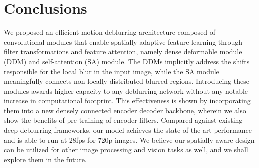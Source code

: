 \documentclass[letterpaper]{article} \usepackage{aaai20}  \usepackage{times}  \usepackage{helvet} \usepackage{courier}  \usepackage[hyphens]{url}  \usepackage{graphicx} \urlstyle{rm} \def\UrlFont{\rm}  \usepackage{graphicx}  \frenchspacing  \setlength{\pdfpagewidth}{8.5in}  \setlength{\pdfpageheight}{11in}
\begin{document}
\section{Conclusions}
We proposed an efficient motion deblurring architecture composed of convolutional modules that enable spatially adaptive feature learning through filter transformations and feature attention, namely dense deformable module (DDM) and self-attention (SA) module. The DDMs implicitly address the shifts responsible for the local blur in the input image, while the SA module meaningfully connects non-locally distributed blurred regions. Introducing these modules awards higher capacity to any deblurring network without any notable increase in computational footprint. This effectiveness is shown by incorporating them into a new densely connected encoder decoder backbone, wherein we also show the benefits of pre-training of encoder filters. Compared against existing deep deblurring frameworks, our model achieves the state-of-the-art performance and is able to run at 28fps for 720p images. We believe our spatially-aware design can be utilized for other image processing and vision tasks as well, and we shall explore them in the future.

{\small


}
\end{document}
